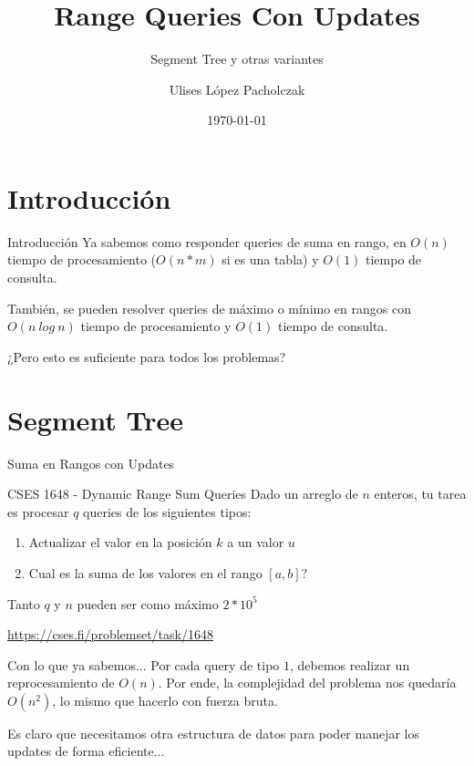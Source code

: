 \documentclass{beamer}
\title{Range Queries Con Updates}
\subtitle{Segment Tree y otras variantes}
\author{Ulises López Pacholczak}
\date{\today}
\begin{document}
\begin{frame}
\titlepage
\end{frame}

\begin{frame}
\tableofcontents
\end{frame}

\section{Introducción}

\begin{frame}{Introducción}
Ya sabemos como responder queries de suma en rango, en $O(n)$ tiempo de procesamiento ($O(n*m)$ si es una tabla) y $O(1)$ tiempo de consulta.

\pause
También, se pueden resolver queries de máximo o mínimo en rangos con $O(n\:log\: n)$ tiempo de procesamiento y $O(1)$ tiempo de consulta.

\pause
¿Pero esto es suficiente para todos los problemas?
\end{frame}

\section{Segment Tree}

\begin{frame}{Suma en Rangos con Updates}

\begin{block}{CSES 1648 - Dynamic Range Sum Queries}
Dado un arreglo de $n$ enteros, tu tarea es procesar $q$ queries de los siguientes tipos:
\begin{enumerate}
    \item Actualizar el valor en la posición $k$ a un valor $u$
    \item Cual es la suma de los valores en el rango $[a,b]$?
\end{enumerate}
Tanto $q$ y $n$ pueden ser como máximo $2*10^5$
\end{block}

\url{https://cses.fi/problemset/task/1648}
\end{frame}

\begin{frame}{Con lo que ya sabemos...}
Por cada query de tipo $1$, debemos realizar un reprocesamiento de $O(n)$. Por ende, la complejidad del problema nos quedaría $O(n^2)$, lo mismo que hacerlo con fuerza bruta.

\pause
Es claro que necesitamos otra estructura de datos para poder manejar los updates de forma eficiente...
\end{frame}
\end{document}
